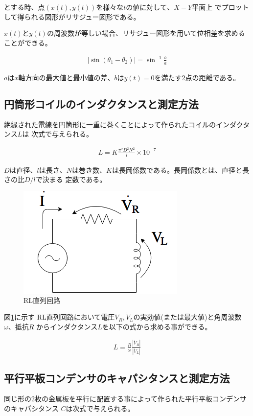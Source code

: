 \documentclass[dvipdfmx]{jsarticle}
\begin{document}
とする時、点$(x(t), y(t))を様々なtの値に対して、X-Y平面上$
でプロットして得られる図形がリサジュー図形である。

$x(t)とy(t)$の周波数が等しい場合、リサジュー図形を用いて位相差を求めることができる。

\begin{eqnarray}
  |\sin(\theta_1 - \theta_2)| = \sin^{-1} \frac{b}{a}
\end{eqnarray}

$a$は$x軸方向$の最大値と最小値の差、$b$は$y(t) = 0$を満たす2点の距離である。

\subsection{円筒形コイルのインダクタンスと測定方法}
絶縁された電線を円筒形に一重に巻くことによって作られたコイルのインダクタンス$L$は
次式で与えられる。

\begin{eqnarray}
  L = K \frac{\pi^2 D^2 N^2}{l} \times 10^{-7}
\end{eqnarray}

$Dは直径、lは長さ、Nは巻き数、Kは長岡係数である。$長岡係数とは、直径と長さの比$D/l$で決まる
定数である。

\begin{figure}[h]
  \centering
  \includegraphics[scale=0.4]{RL_Series_Circut.png}
  \caption{RL直列回路}
  \label{fig:RL_Series_Circuit}
\end{figure}

図\ref{fig:RL_Series_Circuit}に示す
RL直列回路において電圧$\dot V_R, \dot V_L$の実効値(または最大値)と角周波数$\omega、抵抗R$
からインダクタンス$L$を以下の式から求める事ができる。

\begin{eqnarray}
  L = \frac{R}{\omega}\frac{|\dot V_R|}{|\dot V_L|}
\end{eqnarray}

\subsection{平行平板コンデンサのキャパシタンスと測定方法}
同じ形の2枚の金属板を平行に配置する事によって作られた平行平板コンデンサのキャパシタンス
$C$は次式で与えられる。
\end{document}
